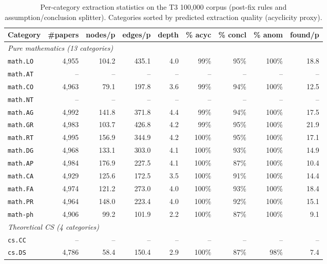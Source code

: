\begin{table}[h]
\centering
\footnotesize
\caption{Per-category extraction statistics on the T3 100{,}000 corpus (post-fix rules and assumption/conclusion splitter). Categories sorted by predicted extraction quality (acyclicity proxy).}
\label{tab:cross-category}
\renewcommand{\arraystretch}{1.05}

\begin{tabular}{@{}lrrrrrrrr@{}}
\toprule
\textbf{Category} & \textbf{\#papers} & \textbf{nodes/p} & \textbf{edges/p} & \textbf{depth} & \textbf{\% acyc} & \textbf{\% concl} & \textbf{\% anom} & \textbf{found/p} \\
\midrule
\multicolumn{9}{l}{\textit{Pure mathematics (13 categories)}} \\
\texttt{math.LO} & 4{,}955 & 104.2 & 435.1 & 4.0 & 99\% & 95\% & 100\% & 18.8 \\
\texttt{math.AT} & -- & -- & -- & -- & -- & -- & -- & -- \\
\texttt{math.CO} & 4{,}963 & 79.1 & 197.8 & 3.6 & 99\% & 94\% & 100\% & 12.5 \\
\texttt{math.NT} & -- & -- & -- & -- & -- & -- & -- & -- \\
\texttt{math.AG} & 4{,}992 & 141.8 & 371.8 & 4.4 & 99\% & 94\% & 100\% & 17.5 \\
\texttt{math.GR} & 4{,}983 & 103.7 & 426.8 & 4.2 & 99\% & 95\% & 100\% & 21.9 \\
\texttt{math.RT} & 4{,}995 & 156.9 & 344.9 & 4.2 & 100\% & 95\% & 100\% & 17.1 \\
\texttt{math.DG} & 4{,}968 & 133.1 & 303.0 & 4.1 & 100\% & 93\% & 100\% & 14.9 \\
\texttt{math.AP} & 4{,}984 & 176.9 & 227.5 & 4.1 & 100\% & 87\% & 100\% & 10.4 \\
\texttt{math.CA} & 4{,}929 & 125.6 & 172.5 & 3.5 & 100\% & 91\% & 100\% & 14.4 \\
\texttt{math.FA} & 4{,}974 & 121.2 & 273.0 & 4.0 & 100\% & 93\% & 100\% & 18.4 \\
\texttt{math.PR} & 4{,}964 & 148.0 & 223.4 & 4.0 & 100\% & 92\% & 100\% & 15.1 \\
\texttt{math-ph} & 4{,}906 & 99.2 & 101.9 & 2.2 & 100\% & 87\% & 100\% & 9.1 \\
\midrule
\multicolumn{9}{l}{\textit{Theoretical CS (4 categories)}} \\
\texttt{cs.CC} & -- & -- & -- & -- & -- & -- & -- & -- \\
\texttt{cs.DS} & 4{,}786 & 58.4 & 150.4 & 2.9 & 100\% & 87\% & 98\% & 7.4 \\

\end{tabular}
\end{table}
